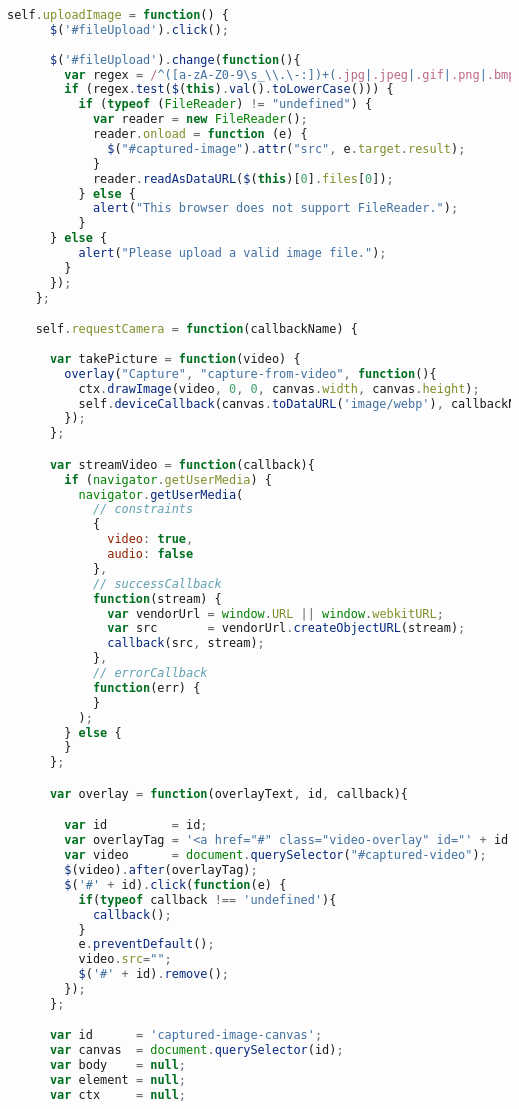 \begin{lstlisting}[language=JavaScript]
    self.uploadImage = function() {
      $('#fileUpload').click();
      
      $('#fileUpload').change(function(){
        var regex = /^([a-zA-Z0-9\s_\\.\-:])+(.jpg|.jpeg|.gif|.png|.bmp)$/;
        if (regex.test($(this).val().toLowerCase())) {
          if (typeof (FileReader) != "undefined") {
            var reader = new FileReader();
            reader.onload = function (e) {
              $("#captured-image").attr("src", e.target.result);
            }
            reader.readAsDataURL($(this)[0].files[0]);
          } else {
            alert("This browser does not support FileReader.");
          }
      } else {
          alert("Please upload a valid image file.");
        }
      });
    };

    self.requestCamera = function(callbackName) {
      
      var takePicture = function(video) {
        overlay("Capture", "capture-from-video", function(){
          ctx.drawImage(video, 0, 0, canvas.width, canvas.height);
          self.deviceCallback(canvas.toDataURL('image/webp'), callbackName);
        });
      };

      var streamVideo = function(callback){
        if (navigator.getUserMedia) {
          navigator.getUserMedia(
            // constraints
            {
              video: true,
              audio: false
            },
            // successCallback
            function(stream) {
              var vendorUrl = window.URL || window.webkitURL;
              var src       = vendorUrl.createObjectURL(stream);
              callback(src, stream);
            },
            // errorCallback
            function(err) {
            }
          );
        } else {
        }
      };

      var overlay = function(overlayText, id, callback){

        var id         = id;
        var overlayTag = '<a href="#" class="video-overlay" id="' + id + '">' + overlayText + '</a>';
        var video      = document.querySelector("#captured-video");
        $(video).after(overlayTag);
        $('#' + id).click(function(e) {
          if(typeof callback !== 'undefined'){
            callback();
          }
          e.preventDefault();
          video.src="";
          $('#' + id).remove();
        });
      };

      var id      = 'captured-image-canvas';
      var canvas  = document.querySelector(id);
      var body    = null;
      var element = null;
      var ctx     = null;


\end{lstlisting}
